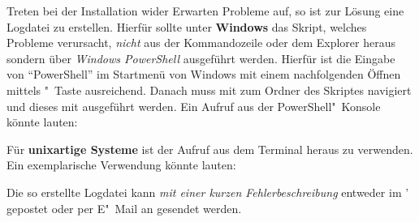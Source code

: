 Treten bei der Installation wider Erwarten Probleme auf, so ist zur Lösung eine 
Logdatei zu erstellen. Hierfür sollte unter \textbf{Windows} das Skript, 
welches Probleme verursacht, \emph{nicht} aus der Kommandozeile oder dem 
Explorer heraus sondern über \emph{Windows PowerShell} ausgeführt werden. 
Hierfür ist die Eingabe von \enquote{PowerShell} im Startmenü von Windows mit 
einem nachfolgenden Öffnen mittels "~Taste ausreichend. 
Danach muss mit  zum Ordner des Skriptes navigiert und dieses mit 
ausgeführt werden. Ein Aufruf aus der PowerShell"~Konsole könnte lauten:
%
\begin{quoting}[rightmargin=0pt]
  \newline%
\end{quoting}
%
Für \textbf{unixartige Systeme} ist der Aufruf 
 aus dem Terminal heraus zu 
verwenden. Ein exemplarische Verwendung könnte lauten:
%
\begin{quoting}
  \newline
\end{quoting}
%
Die so erstellte Logdatei kann \emph{mit einer kurzen Fehlerbeschreibung} 
entweder im \Forum' gepostet oder per E"~Mail an \mailto{\TUDScriptContact}
gesendet werden.%
%
